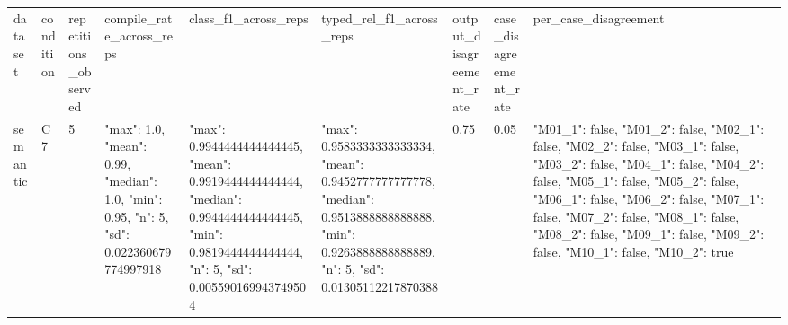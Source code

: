 \begin{tabular}{lllllllll}
dataset & condition & repetitions\_observed & compile\_rate\_across\_reps & class\_f1\_across\_reps & typed\_rel\_f1\_across\_reps & output\_disagreement\_rate & case\_disagreement\_rate & per\_case\_disagreement \\
semantic & C7 & 5 & {"max": 1.0, "mean": 0.99, "median": 1.0, "min": 0.95, "n": 5, "sd": 0.022360679774997918} & {"max": 0.9944444444444445, "mean": 0.9919444444444444, "median": 0.9944444444444445, "min": 0.9819444444444444, "n": 5, "sd": 0.005590169943749504} & {"max": 0.9583333333333334, "mean": 0.9452777777777778, "median": 0.9513888888888888, "min": 0.9263888888888889, "n": 5, "sd": 0.01305112217870388} & 0.75 & 0.05 & {"M01\_1": false, "M01\_2": false, "M02\_1": false, "M02\_2": false, "M03\_1": false, "M03\_2": false, "M04\_1": false, "M04\_2": false, "M05\_1": false, "M05\_2": false, "M06\_1": false, "M06\_2": false, "M07\_1": false, "M07\_2": false, "M08\_1": false, "M08\_2": false, "M09\_1": false, "M09\_2": false, "M10\_1": false, "M10\_2": true} \\
\end{tabular}